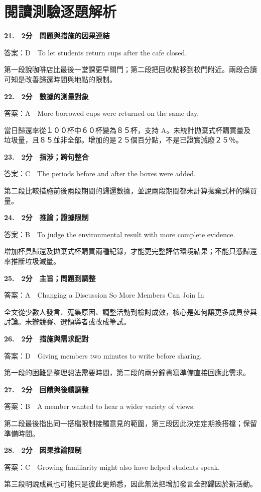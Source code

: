 \documentclass[11pt,a4paper]{article}
\begin{document}
\section*{閱讀測驗逐題解析}
\textbf{21.　2分　問題與措施的因果連結}\par
答案：D　To let students return cups after the cafe closed.
\par\smallskip
第一段說咖啡店比最後一堂課更早關門；第二段把回收點移到校門附近。兩段合讀可知是改善歸還時間與地點的限制。
\par\smallskip
\medskip
{}\textbf{22.　2分　數據的測量對象}\par
答案：A　More borrowed cups were returned on the same day.
\par\smallskip
當日歸還率從１００杯中６０杯變為８５杯，支持 A。未統計拋棄式杯購買量及垃圾量，且８５並非全部。增加的是２５個百分點，不是已證實減廢２５％。
\par\smallskip
\medskip
{}\textbf{23.　2分　指涉；跨句整合}\par
答案：C　The periods before and after the boxes were added.
\par\smallskip
第二段比較措施前後兩段期間的歸還數據，並說兩段期間都未計算拋棄式杯的購買量。
\par\smallskip
\medskip
{}\textbf{24.　2分　推論；證據限制}\par
答案：B　To judge the environmental result with more complete evidence.
\par\smallskip
增加杯具歸還及拋棄式杯購買兩種紀錄，才能更完整評估環境結果；不能只憑歸還率推斷垃圾減量。
\par\smallskip
\medskip
{}\textbf{25.　2分　主旨；問題到調整}\par
答案：A　Changing a Discussion So More Members Can Join In
\par\smallskip
全文從少數人發言、蒐集原因、調整活動到檢討成效，核心是如何讓更多成員參與討論。未辦競賽、選領導者或改成筆試。
\par\smallskip
\medskip
{}\textbf{26.　2分　措施與需求配對}\par
答案：D　Giving members two minutes to write before sharing.
\par\smallskip
第一段的困難是整理想法需要時間，第二段的兩分鐘書寫準備直接回應此需求。
\par\smallskip
\medskip
{}\textbf{27.　2分　回饋與後續調整}\par
答案：B　A member wanted to hear a wider variety of views.
\par\smallskip
第二段最後指出同一搭檔限制接觸意見的範圍，第三段因此決定定期換搭檔；保留準備時間。
\par\smallskip
\medskip
{}\textbf{28.　2分　因果推論限制}\par
答案：C　Growing familiarity might also have helped students speak.
\par\smallskip
第三段明說成員也可能只是彼此更熟悉，因此無法把增加發言全部歸因於新活動。
\par\smallskip
\medskip
\end{document}
